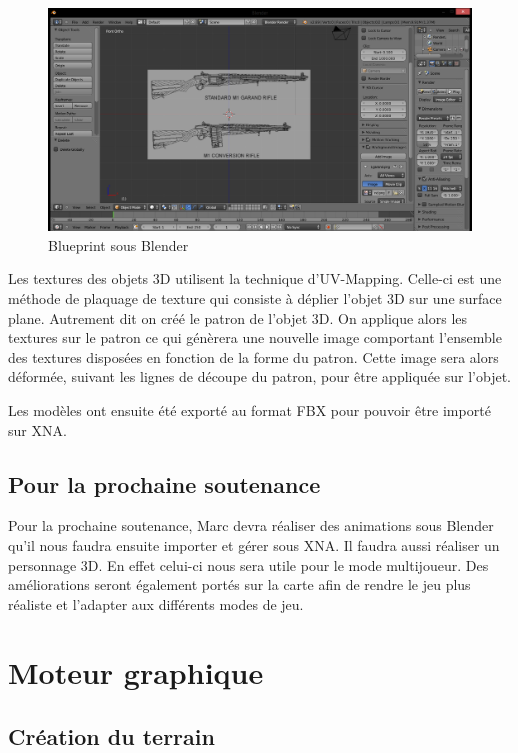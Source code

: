 \documentclass[11pt]{report}
\begin{document}
\begin{figure}[htbp]
\centering
\includegraphics[scale=0.25]{blueprint.png}
\caption{Blueprint sous Blender}
\end{figure}

Les textures des objets 3D utilisent la technique d’UV-Mapping. Celle-ci est une méthode de plaquage de texture qui consiste à déplier l'objet 3D sur une surface plane. Autrement dit on créé le patron de l'objet 3D. On applique alors les textures sur le patron ce qui génèrera une nouvelle image comportant l'ensemble des textures disposées en fonction de la forme du patron. Cette image sera alors déformée, suivant les lignes de découpe du patron, pour être appliquée sur l'objet.

Les modèles ont ensuite été exporté au format FBX pour pouvoir être importé sur XNA.

\subsection{Pour la prochaine soutenance}

Pour la prochaine soutenance, Marc devra réaliser des animations sous Blender qu'il nous faudra ensuite importer et gérer sous XNA. Il faudra aussi réaliser un personnage 3D. En effet celui-ci nous sera utile pour le mode multijoueur. Des améliorations seront également portés sur la carte afin de rendre le jeu plus réaliste et l'adapter aux différents modes de jeu.

\newpage
\section{Moteur graphique}

\subsection{Création du terrain}
\end{document}
